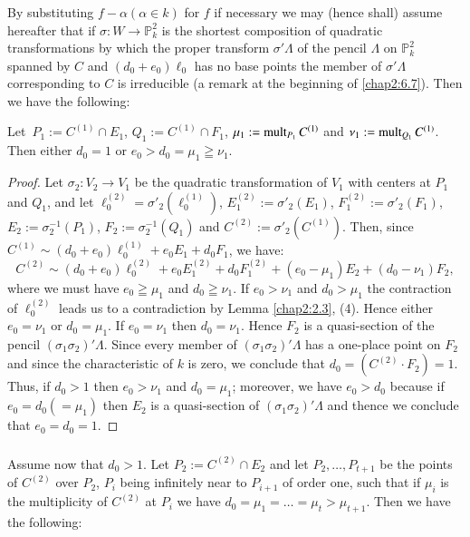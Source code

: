 \subsubsection{}\label{chap2:6.8.2}
By substituting $f-\alpha(\alpha\in k)$ for $f$ if necessary we may
(hence shall) assume hereafter that if $\sigma:W\to
\mathbb{P}^{2}_{k}$ is the shortest composition of quadratic
transformations by which the proper transform $\sigma'\Lambda$ of the
pencil $\Lambda$ on $\mathbb{P}^{2}_{k}$ spanned by $C$ and
$(d_{0}+e_{0})\ell_{0}$ has no base points the member of
$\sigma'\Lambda$ corresponding to $C$ is irreducible (\cf a remark at
the beginning of \ref{chap2:6.7}). Then we have the following:

\begin{lemma*}
Let\pageoriginale\ $P_{1}:=C^{(1)}\cap E_{1}$, $Q_{1}:=C^{(1)}\cap
F_{1}$, $\mu_{1}:=\operatorname{mult}_{P_{1}}C^{(1)}$ and
$\nu_{1}:=\operatorname{mult}_{Q_{1}}C^{(1)}$. Then either $d_{0}=1$ or
$e_{0}>d_{0}=\mu_{1}\geqq \nu_{1}$.
\end{lemma*}

\begin{proof}
Let $\sigma_{2}:V_{2}\to V_{1}$ be the quadratic transformation of
$V_{1}$ with centers at $P_{1}$ and $Q_{1}$, and let
$\ell^{(2)}_{0}=\sigma'_{2}(\ell^{(1)}_{0})$,
$E_{1}^{(2)}:=\sigma'_{2}(E_{1})$, $F^{(2)}_{1}:=\sigma'_{2}(F_{1})$,
$E_{2}:=\sigma^{-1}_{2}(P_{1})$, $F_{2}:=\sigma^{-1}_{2}(Q_{1})$ and
$C^{(2)}:=\sigma'_{2}(C^{(1)})$. Then, since $C^{(1)}\sim
(d_{0}+e_{0})\ell^{(1)}_{0}+e_{0}E_{1}+d_{0}F_{1}$, we have:
$$
C^{(2)}\sim
(d_{0}+e_{0})\ell^{(2)}_{0}+e_{0}E_{1}^{(2)}+d_{0}F_{1}^{(2)}+(e_{0}-\mu_{1})E_{2}+(d_{0}-\nu_{1})F_{2}, 
$$
where we must have $e_{0}\geqq \mu_{1}$ and $d_{0}\geqq \nu_{1}$. If
$e_{0}>\nu_{1}$ and $d_{0}>\mu_{1}$ the contraction of
$\ell^{(2)}_{0}$ leads us to a contradiction by Lemma \ref{chap2:2.3},
(4). Hence either $e_{0}=\nu_{1}$ or $d_{0}=\mu_{1}$. If
$e_{0}=\nu_{1}$ then $d_{0}=\nu_{1}$. Hence $F_{2}$ is a quasi-section
of the pencil $(\sigma_{1}\sigma_{2})'\Lambda$. Since every member of
$(\sigma_{1}\sigma_{2})'\Lambda$ has a one-place point on $F_{2}$ and
since the characteristic of $k$ is zero, we conclude that
$d_{0}=(C^{(2)}\cdot F_{2})=1$. Thus, if $d_{0}>1$ then
$e_{0}>\nu_{1}$ and $d_{0}=\mu_{1}$; moreover, we have $e_{0}>d_{0}$
because if $e_{0}=d_{0}(=\mu_{1})$ then $E_{2}$ is a quasi-section of
$(\sigma_{1}\sigma_{2})'\Lambda$ and thence we conclude that
$e_{0}=d_{0}=1$.
\end{proof}

\subsubsection{}\label{chap2:6.8.3}
Assume now that $d_{0}>1$. Let $P_{2}:=C^{(2)}\cap E_{2}$ and let
$P_{2},\ldots,P_{t+1}$ be the points of $C^{(2)}$ over $P_{2}$,
$P_{i}$ being infinitely near to $P_{i+1}$ of order one, such that if
$\mu_{i}$ is the multiplicity of $C^{(2)}$ at $P_{i}$ we have
$d_{0}=\mu_{1}=\ldots=\mu_{t}>\mu_{t+1}$. Then we have the following:

